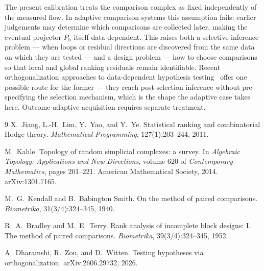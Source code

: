 \documentclass[11pt,a4paper]{article}
\newcommand{\Ph}{P_{\mathrm{h}}}
\begin{document}
The present calibration treats the comparison complex as fixed independently of
the measured flow. In adaptive comparison systems this assumption fails: earlier
judgements may determine which comparisons are collected later, making the
eventual projector $\Ph$ itself data-dependent. This raises both a
selective-inference problem --- when loops or residual directions are discovered
from the same data on which they are tested --- and a design problem --- how to
choose comparisons so that local and global ranking residuals remain
identifiable. Recent orthogonalization approaches to data-dependent hypothesis
testing~\cite{dharamshi2026} offer one possible route for the former ---
they reach post-selection inference without pre-specifying the selection
mechanism, which is the shape the adaptive case takes here. Outcome-adaptive
acquisition requires separate treatment.

\begin{thebibliography}{9}
X.~Jiang, L.-H.~Lim, Y.~Yao, and Y.~Ye.
\newblock Statistical ranking and combinatorial Hodge theory.
\newblock \emph{Mathematical Programming}, 127(1):203--244, 2011.

M.~Kahle.
\newblock Topology of random simplicial complexes: a survey.
\newblock In \emph{Algebraic Topology: Applications and New Directions},
volume 620 of \emph{Contemporary Mathematics}, pages 201--221. American
Mathematical Society, 2014. \newblock arXiv:1301.7165.

M.~G.~Kendall and B.~Babington Smith.
\newblock On the method of paired comparisons.
\newblock \emph{Biometrika}, 31(3/4):324--345, 1940.

R.~A.~Bradley and M.~E.~Terry.
\newblock Rank analysis of incomplete block designs: I. The method of paired
comparisons.
\newblock \emph{Biometrika}, 39(3/4):324--345, 1952.

A.~Dharamshi, R.~Zou, and D.~Witten.
\newblock Testing hypotheses via orthogonalization.
\newblock arXiv:2606.29732, 2026.
\end{thebibliography}
\end{document}
